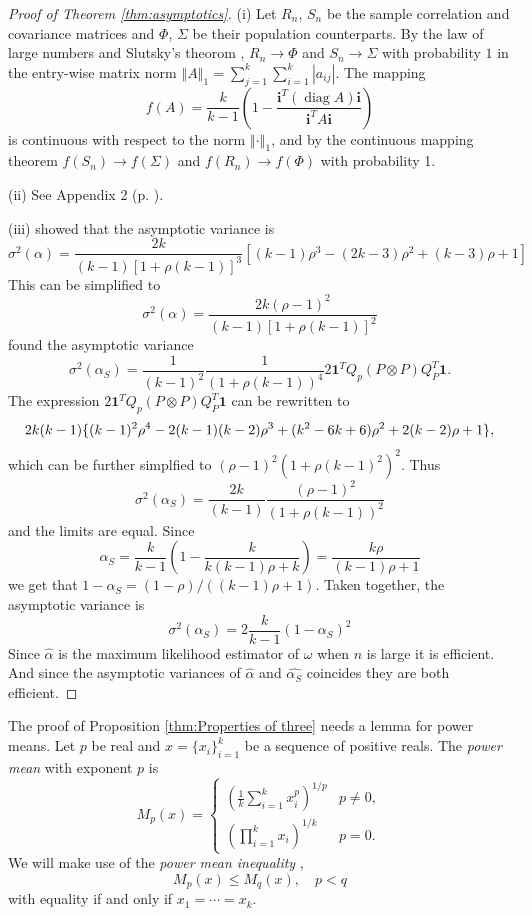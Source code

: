 \documentclass[twoside]{article}
\DeclareMathOperator{\diag}{diag}
\DeclareMathOperator{\tsum}{\textstyle \sum}
\begin{document}
\begin{proof}[Proof of Theorem \ref{thm:asymptotics}]\label{proof:asymptotics}
(i) Let $R_{n}$, $S_{n}$ be the sample correlation and covariance matrices
and $\Phi$, $\Sigma$ be their population counterparts. By the law
of large numbers and Slutsky's theorom \citep[][Lemma 2.8, p. 11]{Van_der_Vaart2000-qc}, $R_{n}\to\Phi$ and $S_{n}\to\Sigma$
with probability $1$ in the entry-wise matrix norm $\left\Vert A\right\Vert _{1}=\tsum_{j=1}^{k}\tsum_{i=1}^{k}\left|a_{ij}\right|$.
The mapping
\[
f(A)=\frac{k}{k-1}\left(1-\frac{\mathbf{i}^{T}(\diag A)\mathbf{i}}{\mathbf{i}^{T}A\mathbf{i}}\right)
\]
is continuous with respect to the norm $\left\Vert \cdot\right\Vert _{1}$,
and by the continuous mapping theorem \citep[][Theorem 2.3, p. 7]{Van_der_Vaart2000-qc}
$f(S_{n})\to f(\Sigma)$ and $f(R_{n})\to f(\Phi)$
with probability 1.

(ii) See Appendix 2 (p. \pageref{appendix 2}).

(iii) \citet[eq. 22]{Van_Zyl2000-si} showed that the asymptotic variance
is
\[
\sigma^{2}(\alpha)=\frac{2k}{(k-1)[1+\rho(k-1)]^{3}}[(k-1)\rho^{3}-(2k-3)\rho^{2}+(k-3)\rho+1]
\]
This can be simplified to
\[
\sigma^{2}(\alpha)=\frac{2k(\rho-1)^{2}}{(k-1)[1+\rho(k-1)]^{2}}
\]
\citet[equation 10]{hayashi2005note} found the asymptotic variance
\[
\sigma^{2}(\alpha_S)=\frac{1}{(k-1)^{2}}\frac{1}{(1+\rho(k-1))^{4}}2\mathbf{1}^{T}Q_{p}(P\otimes P)Q_{P}^{T}\mathbf{1}.
\]
The expression $2\mathbf{1}^{T}Q_{p}(P\otimes P)Q_{P}^{T}\mathbf{1}$
can be rewritten to \citep[appendix 3]{hayashi2005note}
\[
2k(k-1)\{ (k-1)^{2}\rho^{4}-2(k-1)(k-2)\rho^{3}+(k^{2}-6k+6)\text{\ensuremath{\rho^{2}+2(k-2)\rho+1}}\} ,
\]
which can be further simplfied to $(\rho-1)^{2}(1+\rho(k-1)^{2})^{2}$.
Thus
\[
\sigma^{2}(\alpha_S)=\frac{2k}{(k-1)}\frac{(\rho-1)^{2}}{(1+\rho(k-1))^{2}}
\]
and the limits are equal.
Since
\begin{equation*}
\alpha_S = \frac{k}{k-1}\left(1-\frac{k}{k(k-1)\rho+k}\right) = \frac{k\rho}{(k-1)\rho+1}
\end{equation*}
we get that $1-\alpha_S = (1-\rho)/((k-1)\rho+1)$. Taken together, the asymptotic variance is
\[
\sigma^{2}(\alpha_S)=2\frac{k}{k-1}(1-\alpha_S)^{2}
\]
Since $\hat{\alpha}$ is the maximum likelihood estimator of $\omega$
when $n$ is large it is efficient. And since the asymptotic variances
of $\hat{\alpha}$ and $\hat{\alpha_S}$ coincides they
are both efficient.
\end{proof}

The proof of Proposition \ref{thm:Properties of three} needs a lemma for power means. Let $p$ be real and $x=\{x_{i}\} _{i=1}^{k}$ be a sequence
of positive reals. The \textit{power mean} with exponent $p$ is
\[
M_{p}(x)=\begin{cases}
(\frac{1}{k}\tsum_{i=1}^{k}x_{i}^{p})^{1/p} & p\neq0,\\
(\prod_{i=1}^{k}x_{i})^{1/k} & p=0.
\end{cases}
\]
We will make use of the \textit{power mean inequality} \citep[][Chapter III]{Bullen2013-os},
\begin{equation}
M_{p}(x)\leq M_{q}(x),\quad p<q\label{eq:generalized mean inequality}
\end{equation}
with equality if and only if $x_{1}=\cdots=x_{k}$. 
\end{document}
